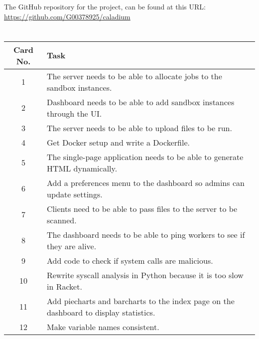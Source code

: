 \begin{appendices}
\renewcommand{\chaptername}{Appendix A}
\renewcommand{\thechapter}{A}
\chapter{}
The GitHub repository for the project, can be found at this URL: \\
\href{https://github.com/G00378925/caladium}{https://github.com/G00378925/caladium}

\renewcommand{\chaptername}{Appendix B}
\renewcommand{\thechapter}{B}
\chapter{}

\begin{table}[ht]
    \begin{tabular}{|c|p{14cm}|}
        \hline
        Card No. & Task \\
        \hline
        1 & The server needs to be able to allocate jobs to the sandbox instances. \\
        \hline
        2 & Dashboard needs to be able to add sandbox instances through the UI. \\
        \hline
        3 & The server needs to be able to upload files to be run. \\
        \hline
        4 & Get Docker setup and write a Dockerfile. \\
        \hline
        5 & The single-page application needs to be able to generate HTML dynamically. \\
        \hline
        6 & Add a preferences menu to the dashboard so admins can update settings. \\
        \hline
        7 & Clients need to be able to pass files to the server to be scanned. \\
        \hline
        8 & The dashboard needs to be able to ping workers to see if they are alive. \\
        \hline
        9 & Add code to check if system calls are malicious. \\
        \hline
        10 & Rewrite syscall analysis in Python because it is too slow in Racket. \\
        \hline
        11 & Add piecharts and barcharts to the index page on the dashboard to display statistics. \\
        \hline
        12 & Make variable names consistent. \\

\end{tabular}
\end{table}
\end{appendices}
